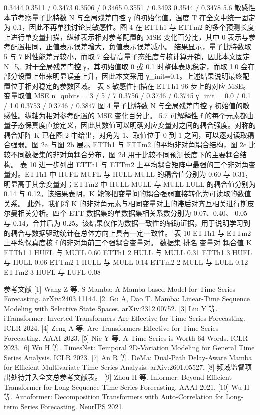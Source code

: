 \documentclass[
]{article}
\begin{document}
0.3444 0.3511 / 0.3473 0.3506 / 0.3465 0.3551 / 0.3493 0.3544 / 0.3478
5.6 敏感性 本节考察量子比特数 N 与全局残差门控 γ 的初始化值。温度 T
在全文中统一固定为 0.1，因此不再单独讨论其敏感性。图 4 在 ETTh1 与 ETTm2
的多个预测长度上进行单变量扫描，纵轴表示相对参考配置的 MSE
变化百分比，其中 0
表示与参考配置相同，正值表示误差增大，负值表示误差减小。
结果显示，量子比特数取 5 与 7 时性能差异较小，而取 7
会提高量子态维度与核计算开销，因此本文固定 N=5。对于全局残差门控
γ，其初始值取 0 或 0.1 时整体表现稳定，而取 1.0
会在部分设置上带来明显误差上升，因此本文采用
γ\_init=0.1。上述结果说明最终配置位于相对稳定的参数区域。 表 8
敏感性扫描在 ETTh1 96 步上的对应 MSE。 变量取值 MSE n\_qubits = 3 / 5 /
7 0.3756 / 0.3746 / 0.3745 γ\_init = 0.0 / 0.1 / 1.0 0.3753 / 0.3746 /
0.3847 图 4 量子比特数 N 与全局残差门控 γ
初始值的敏感性。纵轴为相对参考配置的 MSE 变化百分比。 5.7 可解释性 f
的每个元素都由量子态保真度直接定义，因此其数值可以明确对应变量对之间的耦合强度。对称的耦合矩阵
K 已在图 2 中给出，对角为 1、取值位于 0 到 1
之间，可以逐对读取耦合强弱。图 2a 与图 2b 展示 ETTh1 与 ETTm2
的平均非对角耦合结构，图 2c 比较不同数据集的非对角耦合分布，图 2d
用于比较不同预测长度下的主要耦合结构。 表 10 进一步列出 ETTh1 与 ETTm2
上平均耦合矩阵中最强的三个非对角变量对。ETTh1 中 HUFL-MUFL 与 HULL-MULL
的耦合值分别为 0.60 与 0.31，明显高于其余变量对；ETTm2 中 HULL-MULL 与
MULL-LULL 的耦合值分别为 0.14 与 0.12。该结果表明，K
能够把变量间的耦合强弱直接转化为可读取的数值关系。 此外，我们将 K
的非对角元素与相同变量对上的滞后对齐互相关进行斯皮尔曼相关分析。四个 ETT
数据集的单数据集相关系数分别为 0.07、0.40、-0.05 与 0.14，合并后为
0.25。该结果仅作为数据一致性的辅助证据，用于说明学习到的耦合与数据驱动统计在总体方向上具有一定一致性。
表 10 ETTh1 与 ETTm2 上平均保真度核 f 的非对角前三个强耦合变量对。
数据集 排名 变量对 耦合值 K ETTh1 1 HUFL 与 MUFL 0.60 ETTh1 2 HULL 与
MULL 0.31 ETTh1 3 HUFL 与 HULL 0.06 ETTm2 1 HULL 与 MULL 0.14 ETTm2 2
MULL 与 LULL 0.12 ETTm2 3 HUFL 与 LUFL 0.08

参考文献 {[}1{]} Wang Z 等. S-Mamba: A Mamba-based Model for Time Series
Forecasting. arXiv:2403.11144. {[}2{]} Gu A, Dao T. Mamba: Linear-Time
Sequence Modeling with Selective State Spaces. arXiv:2312.00752. {[}3{]}
Liu Y 等. iTransformer: Inverted Transformers Are Effective for Time
Series Forecasting. ICLR 2024. {[}4{]} Zeng A 等. Are Transformers
Effective for Time Series Forecasting. AAAI 2023. {[}5{]} Nie Y 等. A
Time Series is Worth 64 Words. ICLR 2023. {[}6{]} Wu H 等. TimesNet:
Temporal 2D-Variation Modeling for General Time Series Analysis. ICLR
2023. {[}7{]} An R 等. DeMa: Dual-Path Delay-Aware Mamba for Efficient
Multivariate Time Series Analysis. arXiv:2601.05527. {[}8{]}
频域监督项出处待并入全文总参考文献表。 {[}9{]} Zhou H 等. Informer:
Beyond Efficient Transformer for Long Sequence Time-Series Forecasting.
AAAI 2021. {[}10{]} Wu H 等. Autoformer: Decomposition Transformers with
Auto-Correlation for Long-term Series Forecasting. NeurIPS 2021.
\end{document}

